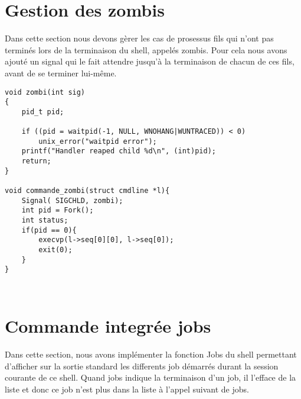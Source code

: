 \documentclass{report}
\begin{document}
		\section{Gestion des zombis}
	Dans cette section nous devons g\`erer les cas de prosessus fils qui n'ont pas termin\'es lors de la terminaison du shell, appel\'es zombis. Pour cela nous avons ajout\'e un signal qui le fait attendre jusqu'\`a la terminaison de chacun de ces fils, avant de se terminer lui-m\^eme.\\
			\begin{lstlisting}
void zombi(int sig)
{
    pid_t pid;

    if ((pid = waitpid(-1, NULL, WNOHANG|WUNTRACED)) < 0)
        unix_error("waitpid error");
    printf("Handler reaped child %d\n", (int)pid);
    return;
}

void commande_zombi(struct cmdline *l){
	Signal( SIGCHLD, zombi);
	int pid = Fork();
	int status;
	if(pid == 0){
		execvp(l->seq[0][0], l->seq[0]);
		exit(0);
	}
}
			\end{lstlisting}
			\begin{lstlisting}[frame=single,basicstyle=\footnotesize,language=bash]
			\end{lstlisting}
			\begin{lstlisting}[frame=single,basicstyle=\footnotesize,language=bash]
			\end{lstlisting}
		\section{Commande integr\'ee jobs}
			Dans cette section, nous avons impl\'ementer la fonction Jobs du shell permettant d'afficher sur la sortie standard les differents job d\'emarr\'es durant la session courante de ce shell. Quand jobs indique la terminaison d'un job, il l'efface de la liste et donc ce job n'est plus dans la liste \`a l'appel suivant de jobs.\\
			\begin{lstlisting}
			\end{lstlisting}
			\begin{lstlisting}[frame=single,basicstyle=\footnotesize,language=bash]
			\end{lstlisting}
			\begin{lstlisting}[frame=single,basicstyle=\footnotesize,language=bash]
			\end{lstlisting}
\end{document}
